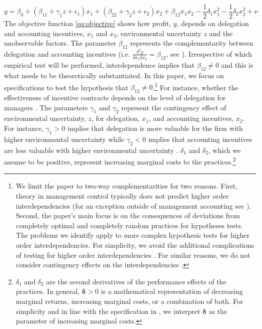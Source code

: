 \documentclass[12pt]{article}
\begin{document}
\begin{equation}\label{eq:objective}
y  = \beta_0 + (\beta_{11} + \gamma_1 z + \epsilon_1) x_1 
						+ (\beta_{22} + \gamma_2 z  + \epsilon_2) x_2 
                        + \beta_{12} x_1 x_2 - \frac{1}{2}\delta_1 x^2_1 - \frac{1}{2}\delta_2 x^2_2 + \nu
\end{equation}
The objective function \eqref{eq:objective} shows how profit, $y$, depends on delegation and accounting incentives, $x_1$ and $x_2$, environmental uncertainty $z$ and the unobservable factors. The parameter $\beta_{12}$ represents the complementarity between delegation and accounting incentives (i.e. $\frac{\delta^2 y}{\delta x_1 \delta x_2} = \beta_{12}$, see \citet{grabner_management_2013}). Irrespective of which empirical test will be performed, interdependence implies that $\beta_{12}\neq0$ and this is what needs to be theoretically substantiated. In this paper, we focus on specifications to test the hypothesis that $\beta_{12} \neq 0$.\footnote{We limit the paper to two-way complementarities for two reasons. First, theory in management control typically does not predict higher order interdependencies (for an exception outside of management accounting see \citet{aral_three-way_2012}). Second, the paper's main focus is on the consequences of deviations from completely optimal and completely random practices for hypotheses tests. The problems we identify apply to more complex hypothesis tests for higher order interdependencies. For simplicity, we avoid the additional complications of testing for higher order interdependencies \citep{carree_note_2011}. For similar reasons, we do not consider contingency effects on the interdependencies \citep{grabner_incentive_2014, grabner_cost_2016, matejka_balancing_2017}.}
For instance, whether the effectiveness of incentive contracts depends on the level of delegation for managers \citep{moers_performance_2006, indjejikian_accounting_2012}. The parameters $\gamma_1$ and $\gamma_2$ represent the contingency effect of environmental uncertainty, $z$, for delegation, $x_1$, and accounting incentives, $x_2$. For instance, $\gamma_1 > 0$ implies that delegation is more valuable for the firm with higher environmental uncertainty while $\gamma_2 < 0$ implies that accounting incentives are less valuable with higher environmental uncertainty \citep{chenhall_management_2003}. 
$\delta_1$ and $\delta_2$, which we assume to be positive, represent increasing marginal costs to the practices.\footnote{$\delta_{1}$ and $\delta_{2}$ are the second derivatives of the performance effects of the practices. In general, $\mathbf{\delta} > 0$ is a mathematical representation of decreasing marginal returns,  increasing marginal  costs, or a combination of both. For simplicity and in line with the specification in \citet{grabner_management_2013}, we interpret $\mathbf{\delta}$ as the parameter of  increasing marginal costs.} 
\end{document}
